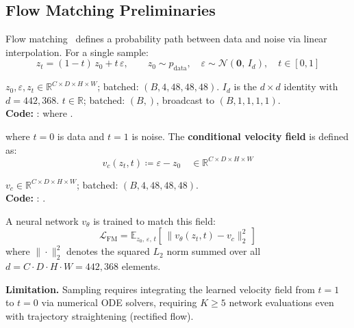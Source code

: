 \subsection{Flow Matching Preliminaries}

Flow matching~\cite{lipman2023,liu2023} defines a probability path between data
and noise via linear interpolation.  For a single sample:
\begin{equation}
  z_t = (1-t)\,z_0 + t\,\varepsilon, \qquad
  z_0 \sim p_{\mathrm{data}},\quad
  \varepsilon \sim \mathcal{N}(\mathbf{0},\,I_d),\quad
  t \in [0,1]
  \label{eq:interpolation}
\end{equation}
\begin{shapes}
$z_0, \varepsilon, z_t \in \mathbb{R}^{C \times D \times H \times W}$;
\quad batched: $(B, 4, 48, 48, 48)$.
\quad $I_d$ is the $d \times d$ identity with $d = 442{,}368$.
\quad $t \in \mathbb{R}$; batched: $(B,)$, broadcast to $(B,1,1,1,1)$.\\
\textbf{Code:} :
where .
\end{shapes}

\noindent
where $t{=}0$ is data and $t{=}1$ is noise. The \textbf{conditional velocity field}
is defined as:
\begin{equation}
  v_c(z_t,t) \coloneqq \varepsilon - z_0
  \quad \in \mathbb{R}^{C \times D \times H \times W}
  \label{eq:cond_velocity}
\end{equation}
\begin{shapes}
$v_c \in \mathbb{R}^{C \times D \times H \times W}$;
\quad batched: $(B, 4, 48, 48, 48)$.\\
\textbf{Code:} : .
\end{shapes}

\noindent
A neural network $v_\theta$ is trained to match this field:
\begin{equation}
  \mathcal{L}_{\mathrm{FM}}
    = \mathbb{E}_{z_0,\,\varepsilon,\,t}
      \left[\,\bigl\|v_\theta(z_t,t) - v_c\bigr\|_2^2\,\right]
  \label{eq:fm_loss}
\end{equation}
where $\|\cdot\|_2^2$ denotes the squared $L_2$ norm summed over all
$d = C \cdot D \cdot H \cdot W = 442{,}368$ elements.

\textbf{Limitation.}  Sampling requires integrating the learned velocity field
from $t{=}1$ to $t{=}0$ via numerical ODE solvers, requiring $K \geq 5$
network evaluations even with trajectory straightening (rectified flow).